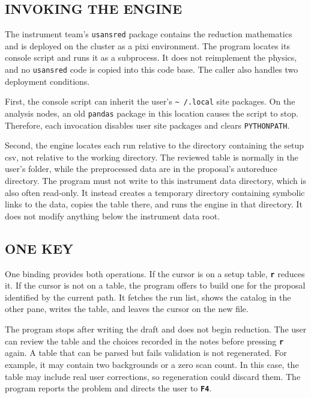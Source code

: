 \documentclass[tm]{ornltm}
\newcommand{\key}[1]{\textbf{\texttt{#1}}}
\begin{document}
\subsection{INVOKING THE ENGINE}

The instrument team's \texttt{usansred} package contains the reduction
mathematics and is deployed on the cluster as a pixi environment. The program
locates its console script and runs it as a subprocess. It does not reimplement
the physics, and no \texttt{usansred} code is copied into this code base. The
caller also handles two deployment conditions.

First, the console script can inherit the user's \texttt{\textasciitilde
/.local} site packages. On the analysis nodes, an old \texttt{pandas} package in
this location causes the script to stop. Therefore, each invocation disables
user site packages and clears \texttt{PYTHONPATH}.

Second, the engine locates each run relative to the directory containing the
setup \ac{csv}, not relative to the working directory. The reviewed table is
normally in the user's folder, while the preprocessed data are in the proposal's
autoreduce directory. The program must not write to this instrument data
directory, which is also often read-only. It instead creates a temporary
directory containing symbolic links to the data, copies the table there, and
runs the engine in that directory. It does not modify anything below the
instrument data root.

\subsection{ONE KEY}

One binding provides both operations. If the cursor is on a setup table,
\key{r} reduces it. If the cursor is not on a table, the program offers to build
one for the proposal identified by the current path. It fetches the run list,
shows the catalog in the other pane, writes the table, and leaves the cursor on
the new file.

The program stops after writing the draft and does not begin reduction. The user
can review the table and the choices recorded in the notes before pressing
\key{r} again. A table that can be parsed but fails validation is not regenerated.
For example, it may contain two backgrounds or a zero scan count. In this case,
the table may include real user corrections, so regeneration could discard
them. The program reports the problem and directs the user to \key{F4}.
\end{document}
